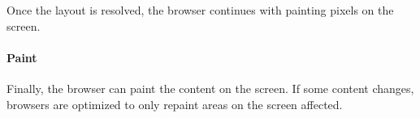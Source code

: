 Once the layout is resolved, the browser continues with painting pixels on the screen.








\paragraph{Paint}

Finally, the browser can paint the content on the screen.
If some content changes, browsers are optimized to only repaint areas on the screen affected.  %
















